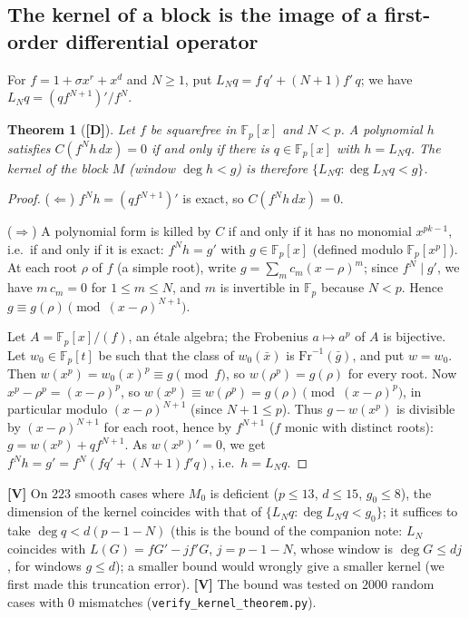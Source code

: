 \documentclass[11pt,a4paper]{article}
\newtheorem{theorem}{Theorem}[section]
\newcommand{\F}{\mathbb{F}}
\begin{document}
\subsection*{The kernel of a block is the image of a first-order differential operator}

For $f=1+\sigma x^r+x^d$ and $N\ge1$, put $L_Nq=f\,q'+(N+1)f'\,q$; we have
$L_Nq=(qf^{N+1})'/f^N$.

\begin{theorem}[\textbf{[D]}]
\label{thm:ker}
Let $f$ be squarefree in $\F_p[x]$ and $N<p$. A polynomial $h$ satisfies
$C(f^Nh\,dx)=0$ if and only if there is $q\in\F_p[x]$ with $h=L_Nq$. The kernel of
the block $M$ (window $\deg h<g$) is therefore $\{L_Nq:\deg L_Nq<g\}$.
\end{theorem}
\begin{proof}
($\Leftarrow$) $f^Nh=(qf^{N+1})'$ is exact, so $C(f^Nh\,dx)=0$.

($\Rightarrow$) A polynomial form is killed by $C$ if and only if it has no
monomial $x^{pk-1}$, i.e.\ if and only if it is exact: $f^Nh=g'$ with
$g\in\F_p[x]$ (defined modulo $\F_p[x^p]$). At each root $\rho$ of $f$ (a simple
root), write $g=\sum_m c_m(x-\rho)^m$; since $f^N\mid g'$, we have $m\,c_m=0$ for
$1\le m\le N$, and $m$ is invertible in $\F_p$ because $N<p$. Hence
$g\equiv g(\rho)\pmod{(x-\rho)^{N+1}}$.

Let $A=\F_p[x]/(f)$, an \'etale algebra; the Frobenius $a\mapsto a^p$ of $A$ is
bijective. Let $w_0\in\F_p[t]$ be such that the class of $w_0(\bar x)$ is
$\mathrm{Fr}^{-1}(\bar g)$, and put $w=w_0$. Then $w(x^p)=w_0(x)^p\equiv g\pmod f$,
so $w(\rho^p)=g(\rho)$ for every root. Now $x^p-\rho^p=(x-\rho)^p$, so
$w(x^p)\equiv w(\rho^p)=g(\rho)\pmod{(x-\rho)^{p}}$, in particular modulo
$(x-\rho)^{N+1}$ (since $N+1\le p$). Thus $g-w(x^p)$ is divisible by
$(x-\rho)^{N+1}$ for each root, hence by $f^{N+1}$ ($f$ monic with distinct
roots): $g=w(x^p)+qf^{N+1}$. As $w(x^p)'=0$, we get
$f^Nh=g'=f^N(fq'+(N+1)f'q)$, i.e.\ $h=L_Nq$.
\end{proof}

\noindent\textbf{[V]} On $223$ smooth cases where $M_0$ is deficient
($p\le13$, $d\le15$, $g_0\le8$), the dimension of the kernel coincides with that
of $\{L_Nq:\deg L_Nq<g_0\}$; it suffices to take $\deg q<d(p-1-N)$ (this is the bound of the companion note:
$L_N$ coincides with $L(G)=fG'-jf'G$, $j=p-1-N$, whose window is $\deg G\le dj$,
for windows $g\le d$); a smaller bound would wrongly give a
smaller kernel (we first made this truncation error). \textbf{[V]} The bound was
tested on $2000$ random cases with $0$ mismatches (\texttt{verify\_kernel\_theorem.py}).
\end{document}
